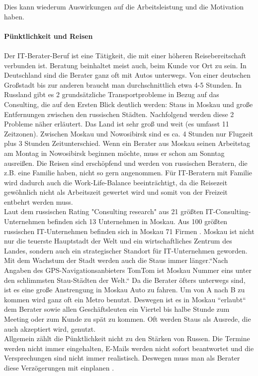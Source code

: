 	 Dies kann wiederum Auswirkungen auf die Arbeitsleistung und die Motivation haben.
	 \\ \\
	 \textbf{Pünktlichkeit und Reisen }\\
	 \\
	 Der IT-Berater-Beruf ist eine Tätigkeit, die mit einer höheren Reisebereitschaft verbunden ist. Beratung beinhaltet meist auch, beim Kunde vor Ort zu sein. In Deutschland sind die Berater ganz oft mit Autos unterwegs. Von einer deutschen Großstadt bis zur anderen braucht man durchschnittlich etwa 4-5 Stunden. In Russland gibt es 2 grundsätzliche Transportprobleme in Bezug auf das Consulting, die auf den Ersten Blick deutlich werden: Staus in Moskau und große Entfernungen zwischen den russischen Städten. Nachfolgend werden diese 2 Probleme näher erläutert. Das Land ist sehr groß und weit (es umfasst 11 Zeitzonen).
	 Zwischen Moskau und Nowosibirsk sind es ca. 4 Stunden nur Flugzeit plus 3 Stunden Zeitunterschied. Wenn ein Berater aus Moskau seinen Arbeitstag am Montag in Nowosibirsk beginnen möchte, muss er schon am Sonntag ausreißen. Die Reisen sind erschöpfend und werden von russischen Beratern, die z.B. eine Familie haben, nicht so gern angenommen. Für IT-Beratern mit Familie wird dadurch auch die Work-Life-Balance beeinträchtigt, da die Reisezeit gewöhnlich nicht als Arbeitszeit gewertet wird und somit von der Freizeit entbehrt werden muss.\\
	 Laut dem russischen Rating "Consulting research" aus 21 größten IT-Consulting-Unternehmen befinden sich 13 Unternehmen in Moskau\cite{RaitConsRU}.
	 Aus 100 größten russischen IT-Unternehmen befinden sich in Moskau 71 Firmen \cite{100BigITConsURU}. 
	 Moskau ist nicht nur die teuerste Hauptstadt der Welt und ein wirtschaftliches Zentrum des Landes, sondern auch ein strategischer Standort für IT-Unternehmen geworden.
	 Mit dem Wachstum der Stadt werden auch die Staus immer länger.``Nach Angaben des GPS-Navigationsanbieters TomTom ist Moskau Nummer eins unter den schlimmsten Stau-Städten der Welt\cite{MoskauStau1}.``
	 Da die Berater öfters unterwegs sind, ist es eine große Anstrengung in Moskau Auto zu fahren. Um von A nach B zu kommen wird ganz oft ein Metro benutzt. 
	 Deswegen ist es in Moskau ``erlaubt`` dem Berater sowie allen Geschäftsleuten ein Viertel bis halbe Stunde zum Meeting oder zum  Kunde zu spät zu kommen. Oft werden Staus als Ausrede, die auch akzeptiert wird, genutzt.\\
	 Allgemein zählt die Pünktlichkeit nicht zu den Stärken von Russen. Die Termine werden nicht immer eingehalten, E-Mails werden nicht sofort beantwortet und die Versprechungen sind nicht immer realistisch. Deswegen muss man als Berater diese Verzögerungen mit einplanen \cite{RusKnigge}.\\ \\
